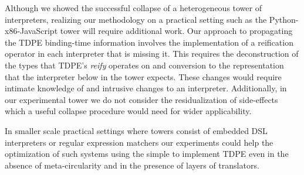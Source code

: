 \documentclass[a4paper,12pt,twoside,openright]{report}
\theoremstyle{definition}
\begin{document}
Although we showed the successful collapse of a heterogeneous tower of interpreters, realizing our methodology on a practical setting such as the Python-x86-JavaScript tower will require additional work. Our approach to propagating the TDPE binding-time information involves the implementation of a reification operator in each interpreter that is missing it. This requires the deconstruction of the types that TDPE's \textit{reify} operates on and conversion to the representation that the interpreter below in the tower expects. These changes would require intimate knowledge of and intrusive changes to an interpreter. Additionally, in our experimental tower we do not consider the residualization of side-effects which a useful collapse procedure would need for wider applicability.


In smaller scale practical settings where towers consist of embedded DSL interpreters or regular expression matchers our experiments could help the optimization of such systems using the simple to implement TDPE even in the absence of meta-circularity and in the presence of layers of translators.
\end{document}
